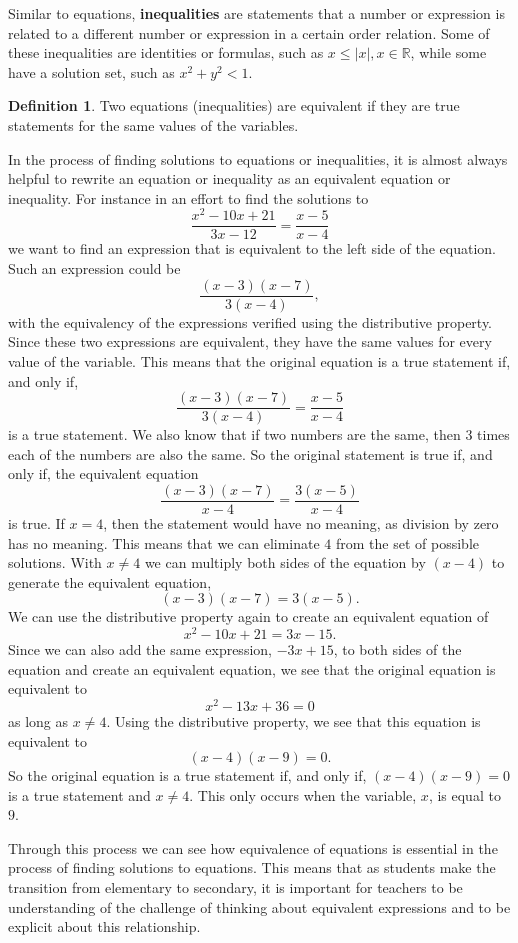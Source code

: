 \documentclass[
]{book}
\theoremstyle{definition}
\newtheorem{definition}{Definition}[chapter]
\theoremstyle{definition}
\theoremstyle{definition}
\theoremstyle{remark}
\begin{document}
Similar to equations, \textbf{inequalities} are statements that a number or expression is related to a different number or expression in a certain order relation. Some of these inequalities are identities or formulas, such as \(x\leq |x|, x\in\mathbb{R}\), while some have a solution set, such as \(x^2+y^2<1\).

\begin{definition}
\protect\hypertarget{def:unnamed-chunk-48}{}{\label{def:unnamed-chunk-48} } Two equations (inequalities) are equivalent if they are true statements for the same values of the variables.
\end{definition}

In the process of finding solutions to equations or inequalities, it is almost always helpful to rewrite an equation or inequality as an equivalent equation or inequality. For instance in an effort to find the solutions to \[\frac{x^2-10x+21}{3x-12} = \frac{x-5}{x-4}\]
we want to find an expression that is equivalent to the left side of the equation. Such an expression could be \[\frac{(x-3)(x-7)}{3(x-4)},\] with the equivalency of the expressions verified using the distributive property. Since these two expressions are equivalent, they have the same values for every value of the variable. This means that the original equation is a true statement if, and only if, \[\frac{(x-3)(x-7)}{3(x-4)}=\frac{x-5}{x-4}\] is a true statement. We also know that if two numbers are the same, then \(3\) times each of the numbers are also the same. So the original statement is true if, and only if, the equivalent equation
\[\frac{(x-3)(x-7)}{x-4}=\frac{3(x-5)}{x-4}\] is true. If \(x=4\), then the statement would have no meaning, as division by zero has no meaning. This means that we can eliminate \(4\) from the set of possible solutions. With \(x\neq 4\) we can multiply both sides of the equation by \((x-4)\) to generate the equivalent equation, \[(x-3)(x-7)=3(x-5).\] We can use the distributive property again to create an equivalent equation of \[x^2-10x+21=3x-15.\] Since we can also add the same expression, \(-3x+15\), to both sides of the equation and create an equivalent equation, we see that the original equation is equivalent to \[x^2-13x+36=0\] as long as \(x\neq 4\). Using the distributive property, we see that this equation is equivalent to \[(x-4)(x-9)=0.\] So the original equation is a true statement if, and only if, \((x-4)(x-9)=0\) is a true statement and \(x\neq 4\). This only occurs when the variable, \(x\), is equal to \(9\).

Through this process we can see how equivalence of equations is essential in the process of finding solutions to equations. This means that as students make the transition from elementary to secondary, it is important for teachers to be understanding of the challenge of thinking about equivalent expressions and to be explicit about this relationship.
\end{document}
